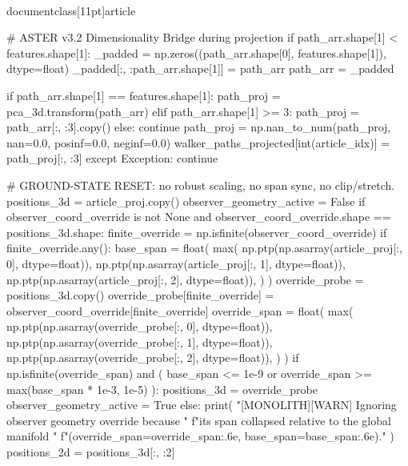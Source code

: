 \\documentclass[11pt]{article}
\begin{document}
\begin{CodeBlock}
{{{{{                # ASTER v3.2 Dimensionality Bridge during projection
                if path_arr.shape[1] < features.shape[1]:
                    _padded = np.zeros((path_arr.shape[0], features.shape[1]), dtype=float)
                    _padded[:, :path_arr.shape[1]] = path_arr
                    path_arr = _padded

                if path_arr.shape[1] == features.shape[1]:
                    path_proj = pca_3d.transform(path_arr)
                elif path_arr.shape[1] >= 3:
                    path_proj = path_arr[:, :3].copy()
                else:
                    continue
                path_proj = np.nan_to_num(path_proj, nan=0.0, posinf=0.0, neginf=0.0)
                walker_paths_projected[int(article_idx)] = path_proj[:, :3]
            except Exception:
                continue

    # GROUND-STATE RESET: no robust scaling, no span sync, no clip/stretch.
    positions_3d = article_proj.copy()
    observer_geometry_active = False
    if observer_coord_override is not None and observer_coord_override.shape == positions_3d.shape:
        finite_override = np.isfinite(observer_coord_override)
        if finite_override.any():
            base_span = float(
                max(
                    np.ptp(np.asarray(article_proj[:, 0], dtype=float)),
                    np.ptp(np.asarray(article_proj[:, 1], dtype=float)),
                    np.ptp(np.asarray(article_proj[:, 2], dtype=float)),
                )
            )
            override_probe = positions_3d.copy()
            override_probe[finite_override] = observer_coord_override[finite_override]
            override_span = float(
                max(
                    np.ptp(np.asarray(override_probe[:, 0], dtype=float)),
                    np.ptp(np.asarray(override_probe[:, 1], dtype=float)),
                    np.ptp(np.asarray(override_probe[:, 2], dtype=float)),
                )
            )
            if np.isfinite(override_span) and (
                base_span <= 1e-9 or override_span >= max(base_span * 1e-3, 1e-5)
            ):
                positions_3d = override_probe
                observer_geometry_active = True
            else:
                print(
                    "[MONOLITH][WARN] Ignoring observer geometry override because "
                    f"its span collapsed relative to the global manifold "
                    f"(override_span={override_span:.6e}, base_span={base_span:.6e})."
                )
    positions_2d = positions_3d[:, :2]

}}}}}
\end{CodeBlock}
\end{document}
